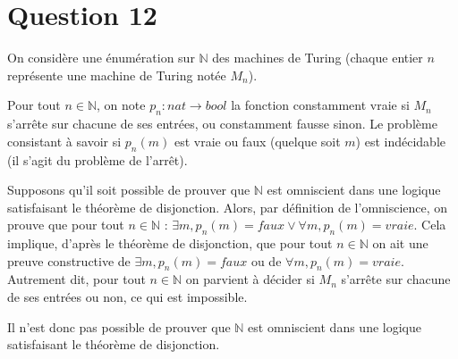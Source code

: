 \documentclass[a4paper,10pt]{article} %
\theoremstyle{definition} %
\newcommand{\N}{\mathbb{N}}
\begin{document}
\section{Question 12}

On considère une énumération sur $\N$ des machines de Turing (chaque entier $n$ représente une machine de Turing notée $M_n$).

Pour tout $n \in \N$, on note $p_n : nat \rightarrow bool$ la fonction constamment vraie si $M_n$ s'arrête sur chacune de ses entrées, ou constamment fausse sinon. Le problème consistant à savoir si $p_n(m)$ est vraie ou faux (quelque soit $m$) est indécidable (il s'agit du problème de l'arrêt).

Supposons qu'il soit possible de prouver que $\N$ est omniscient dans une logique satisfaisant le théorème de disjonction. Alors, par définition de l'omniscience, on prouve que pour tout $n \in \N$ : $\exists m, p_n(m) = faux \vee \forall m, p_n(m) = vraie$. Cela implique, d'après le théorème de disjonction, que pour tout $n \in \N$ on ait une preuve constructive de $\exists m, p_n(m) = faux$ ou de $\forall m, p_n(m) = vraie$. Autrement dit, pour tout $n \in \N$ on parvient à décider si $M_n$ s'arrête sur chacune de ses entrées ou non, ce qui est impossible.

Il n'est donc pas possible de prouver que $\N$ est omniscient dans une logique satisfaisant le théorème de disjonction.

\end{document}
